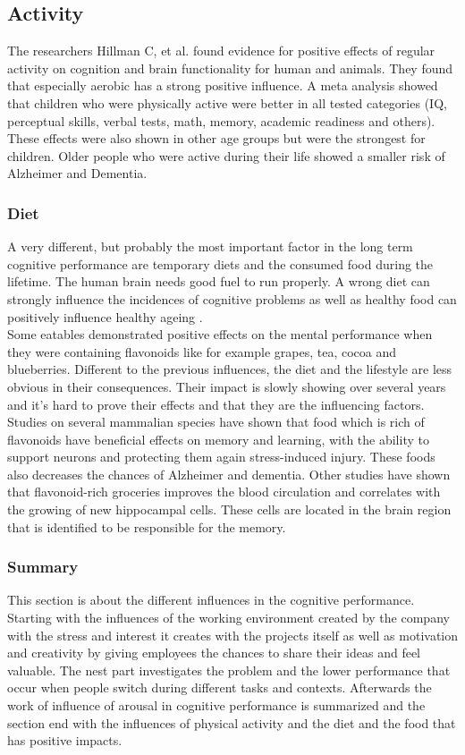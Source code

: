 \subsection{Activity} 
The researchers Hillman C, et al. \cite{hillman2008smart} found evidence for positive effects of regular activity on cognition and brain functionality for human and animals. They found that especially aerobic has a strong positive influence. 
A meta analysis showed that children who were physically active were better in all tested categories (IQ, perceptual skills, verbal tests, math, memory, academic readiness and others). 
These effects were also shown in other age groups but were the strongest for children. Older people who were active during their life showed a smaller risk of Alzheimer and Dementia. 

\subsubsection{Diet}
A very different, but probably the most important factor in the long term cognitive performance are temporary diets and the consumed food during the lifetime. The human brain needs good fuel to run properly. A wrong diet can strongly influence the incidences of cognitive problems as well as healthy food can positively influence healthy ageing \cite{spencer2008food}.\\
Some eatables demonstrated positive effects on the mental performance when they were containing flavonoids like for example grapes, tea, cocoa and blueberries. 
Different to the previous influences, the diet and the lifestyle are less obvious in their consequences. Their impact is slowly showing over several years and it's hard to prove their effects and that they are the influencing factors.\\
Studies on several mammalian species have shown that food which is rich of flavonoids have beneficial effects on memory and learning, with the ability to support neurons and protecting them again stress-induced injury.
These foods also decreases the chances of Alzheimer and dementia. Other studies have shown that flavonoid-rich groceries improves the blood circulation and correlates with the growing of new hippocampal cells. These cells are located in the brain region that is identified to be responsible for the memory.

\subsubsection{Summary} 
This section is about the different influences in the cognitive performance. Starting with the influences of the working environment created by the company with the stress and interest it creates with the projects itself as well as motivation and creativity by giving employees the chances to share their ideas and feel valuable. The nest part investigates the problem and the lower performance that occur when people switch during different tasks and contexts. Afterwards the work of influence of arousal in cognitive performance is summarized and the section end with the influences of physical activity and the diet and the food that has positive impacts. 
